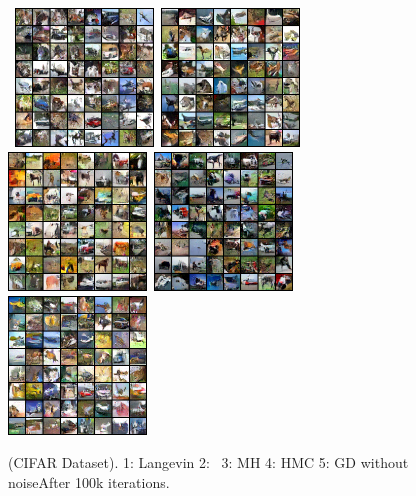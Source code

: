 \documentclass[letterpaper]{article} %
\begin{document}
\begin{figure}
\begin{center}
    \mbox{
        \includegraphics[width=1.45in]{figs/cifarlangevin}
        \includegraphics[width=1.45in]{figs/cifaranila}
        \includegraphics[width=1.45in]{figs/mh_x_q_099900}
                \includegraphics[width=1.45in]{figs/hmc_x_q_099900}
                        \includegraphics[width=1.45in]{figs/gd_x_q_099900}
        }
\end{center}
\caption{(CIFAR Dataset). 1: Langevin 2: \algo\ 3: MH 4: HMC 5: GD without noiseAfter 100k iterations.}
	\label{fig:cifar}
\end{figure}
\end{document}
